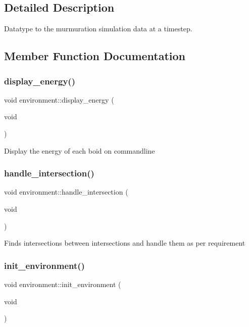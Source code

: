 \subsection{Detailed Description}
Datatype to the murmuration simulation data at a timestep. 

\subsection{Member Function Documentation}
\mbox{\label{classenvironment_ad7c2f863d61f8188dffd3975111f4cb1}} 
\subsubsection{\texorpdfstring{display\+\_\+energy()}{display\_energy()}}
{\footnotesize\ttfamily void environment\+::display\+\_\+energy (\begin{DoxyParamCaption}\item[{void}]{ }\end{DoxyParamCaption})}

Display the energy of each boid on commandline \mbox{\label{classenvironment_ad393e034c116a501e4c39b66d8564087}} 
\subsubsection{\texorpdfstring{handle\+\_\+intersection()}{handle\_intersection()}}
{\footnotesize\ttfamily void environment\+::handle\+\_\+intersection (\begin{DoxyParamCaption}\item[{void}]{ }\end{DoxyParamCaption})}

Finds intersections between intersections and handle them as per requirement \mbox{\label{classenvironment_ab70fa382f51a7e098e6093ed4643be28}} 
\subsubsection{\texorpdfstring{init\+\_\+environment()}{init\_environment()}}
{\footnotesize\ttfamily void environment\+::init\+\_\+environment (\begin{DoxyParamCaption}\item[{void}]{ }\end{DoxyParamCaption})}

